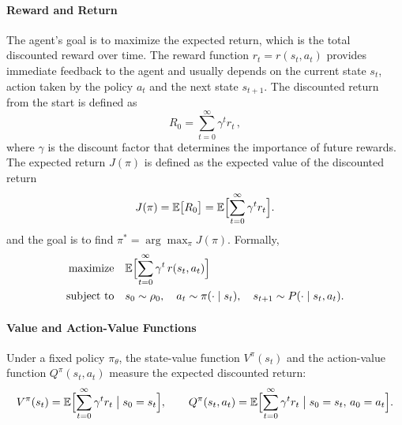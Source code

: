\paragraph{Reward and Return}
The agent's goal is to maximize the expected return, which is the total discounted reward over time. 
The reward function \(r_t=r(s_t,a_t)\) provides immediate feedback to the agent and usually depends on the current state \(s_t\), action taken by the policy \(a_t\) and the next state \(s_{t+1}\). The discounted return from the start is defined as
\begin{equation}
R_0 = \sum_{t=0}^{\infty} \gamma^t r_t\,,
\end{equation}
where \(\gamma\) is the discount factor that determines the importance of future rewards. The expected return \(J(\pi)\) is defined as the expected value of the discounted return
\begin{equation}
J(\pi) = \mathbb{E}\bigl[R_0\bigr]
= \mathbb{E}\Bigl[\sum_{t=0}^\infty \gamma^t r_t\Bigr].
\end{equation}
and the goal is to find \(\pi^* = \arg\max_\pi J(\pi)\). Formally,
\begin{equation}\label{eq:RL_opt}
\begin{aligned}
\text{maximize} \quad & \mathbb{E}\Bigl[\sum_{t=0}^\infty \gamma^t\,r(s_t,a_t)\Bigr] \\
\text{subject to} \quad & s_0 \sim \rho_0, \quad a_t \sim \pi(\cdot\mid s_t), \quad s_{t+1} \sim P(\cdot\mid s_t,a_t).
\end{aligned}
\end{equation}

\paragraph{Value and Action-Value Functions}
Under a fixed policy \(\pi_\theta\), the state-value function \(V^\pi(s_t)\) and the action-value function \(Q^\pi(s_t,a_t)\) measure the expected discounted return:
\begin{equation}
V^\pi(s_t) = \mathbb{E}\Bigl[\sum_{t=0}^\infty \gamma^t r_t \;\big|\; s_0 = s_t\Bigr], 
\qquad
Q^\pi(s_t,a_t) = \mathbb{E}\Bigl[\sum_{t=0}^\infty \gamma^t r_t \;\big|\; s_0 = s_t,\,a_0 = a_t\Bigr].
\end{equation}

